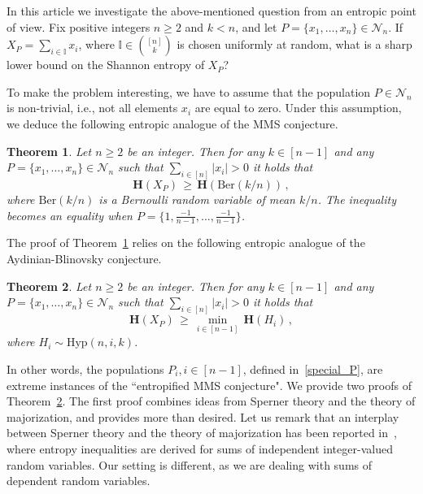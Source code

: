 \documentclass[11pt]{article}
\newtheorem{theorem}{Theorem}
\newcommand{\bh}{\mathbf{H}}
\begin{document}
In this article we investigate the above-mentioned question from an entropic point of view. 
Fix positive integers $n\ge 2$ and $k<n$, and let $P=\{x_1,\ldots,x_n\}\in\mathcal{N}_n$. 
If $X_P = \sum_{i\in \mathbb{I}}x_i$, where $\mathbb{I}\in\binom{[n]}{k}$ is chosen uniformly at random, 
what is a sharp lower bound on the Shannon entropy of $X_P$? 

To make the problem interesting, we have to assume that the population 
$P\in\mathcal{N}_n$ is non-trivial, i.e., not all elements $x_i$ are equal to zero. Under this assumption, we deduce the following entropic analogue of the MMS conjecture. 


\begin{theorem}\label{main_thm}
Let $n\ge 2$ be an integer. Then 
for any $k\in [n-1]$ and any $P=\{x_1,\ldots,x_n\}\in\mathcal{N}_n$ such that $\sum_{i\in [n]}|x_i|>0$ it holds  that 
\[
\bh(X_P) \,\ge\, \bh(\text{Ber}(k/n)) \, ,
\]
where $\text{Ber}(k/n)$ is a Bernoulli random variable of mean $k/n$. 
The inequality becomes an equality when $P=\{1,\frac{-1}{n-1},\ldots,\frac{-1}{n-1}\}$.
\end{theorem}

The proof of Theorem~\ref{main_thm} relies on the following entropic analogue of the Aydinian-Blinovsky conjecture. 

\begin{theorem}\label{main_cor}
Let $n\ge 2$ be an integer. Then 
for any $k\in [n-1]$ and any $P=\{x_1,\ldots,x_n\}\in\mathcal{N}_n$ such that $\sum_{i\in [n]}|x_i|>0$ it holds  that 
\[
\bh(X_P) \,\ge\, \min_{i\in [n-1]} \, \bh(H_i) \, ,  
\]
where $H_i\sim\text{Hyp}(n,i,k)$. 
\end{theorem}

In other words, the populations $P_i, i\in [n-1]$, defined in~\eqref{special_P},  are extreme instances of the ``entropified MMS conjecture".
We provide two proofs of Theorem~\ref{main_cor}. 
The first proof  combines ideas from Sperner theory and the theory of majorization, and provides more than desired. 
Let us remark that an interplay between   Sperner theory  and the theory of majorization has been reported in~\cite{Madiman_Wang_Woo}, where  entropy inequalities are derived for sums of independent integer-valued
random variables. Our setting is different, as we are dealing with  sums of dependent random variables. 
\end{document}

